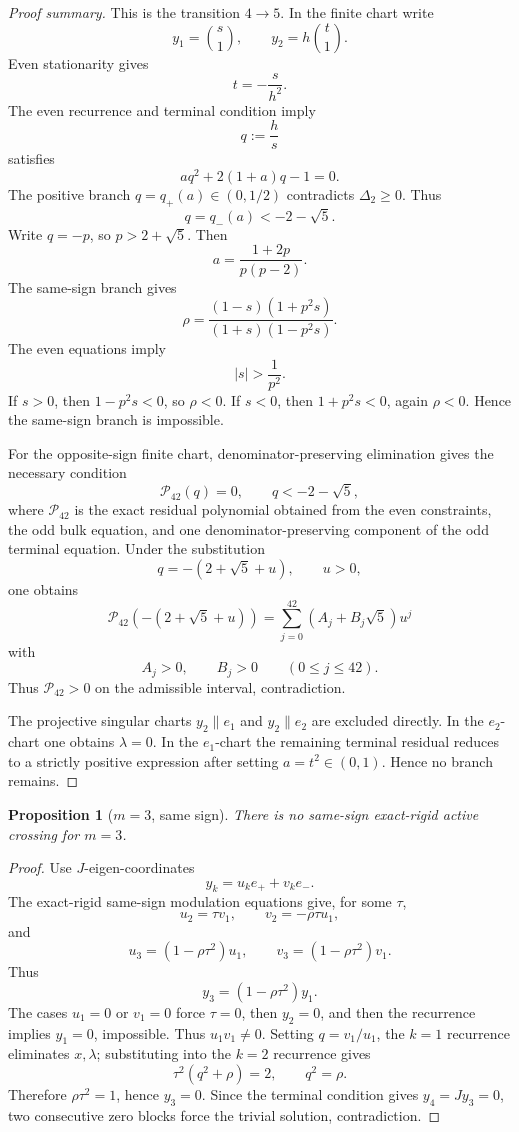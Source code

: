 \documentclass[11pt]{article}
\numberwithin{equation}{section}
\newtheorem{proposition}[theorem]{Proposition}
\begin{document}
\begin{proof}[Proof summary]
This is the transition \(4\to5\). In the finite chart write
\[
y_1=\binom{s}{1},
\qquad
y_2=h\binom{t}{1}.
\]
Even stationarity gives
\[
t=-\frac{s}{h^2}.
\]
The even recurrence and terminal condition imply
\[
q:=\frac hs
\]
satisfies
\[
aq^2+2(1+a)q-1=0.
\]
The positive branch \(q=q_+(a)\in(0,1/2)\) contradicts \(\Delta_2\ge0\). Thus
\[
q=q_-(a)<-2-\sqrt5.
\]
Write \(q=-p\), so \(p>2+\sqrt5\). Then
\[
a=\frac{1+2p}{p(p-2)}.
\]
The same-sign branch gives
\[
\rho=
\frac{(1-s)(1+p^2s)}{(1+s)(1-p^2s)}.
\]
The even equations imply
\[
|s|>\frac1{p^2}.
\]
If \(s>0\), then \(1-p^2s<0\), so \(\rho<0\). If \(s<0\), then
\(1+p^2s<0\), again \(\rho<0\). Hence the same-sign branch is impossible.

For the opposite-sign finite chart, denominator-preserving elimination gives the
necessary condition
\[
\mathcal P_{42}(q)=0,
\qquad q<-2-\sqrt5,
\]
where \(\mathcal P_{42}\) is the exact residual polynomial obtained from the even
constraints, the odd bulk equation, and one denominator-preserving component of
the odd terminal equation. Under the substitution
\[
q=-(2+\sqrt5+u),\qquad u>0,
\]
one obtains
\[
\mathcal P_{42}(-(2+\sqrt5+u))
=
\sum_{j=0}^{42}(A_j+B_j\sqrt5)u^j
\]
with
\[
A_j>0,\qquad B_j>0\qquad(0\le j\le42).
\]
Thus \(\mathcal P_{42}>0\) on the admissible interval, contradiction.

The projective singular charts \(y_2\parallel e_1\) and \(y_2\parallel e_2\) are excluded
directly. In the \(e_2\)-chart one obtains \(\lambda=0\). In the \(e_1\)-chart the
remaining terminal residual reduces to a strictly positive expression after setting
\(a=t^2\in(0,1)\). Hence no branch remains.
\end{proof}

\begin{proposition}[\(m=3\), same sign]
There is no same-sign exact-rigid active crossing for \(m=3\).
\end{proposition}

\begin{proof}
Use \(J\)-eigen-coordinates
\[
y_k=u_ke_+ +v_ke_-.
\]
The exact-rigid same-sign modulation equations give, for some \(\tau\),
\[
u_2=\tau v_1,\qquad
v_2=-\rho\tau u_1,
\]
and
\[
u_3=(1-\rho\tau^2)u_1,\qquad
v_3=(1-\rho\tau^2)v_1.
\]
Thus
\[
y_3=(1-\rho\tau^2)y_1.
\]
The cases \(u_1=0\) or \(v_1=0\) force \(\tau=0\), then \(y_2=0\), and then the
recurrence implies \(y_1=0\), impossible. Thus \(u_1v_1\ne0\). Setting
\(q=v_1/u_1\), the \(k=1\) recurrence eliminates \(x,\lambda\); substituting into the
\(k=2\) recurrence gives
\[
\tau^2(q^2+\rho)=2,
\qquad
q^2=\rho.
\]
Therefore \(\rho\tau^2=1\), hence \(y_3=0\). Since the terminal condition gives
\(y_4=Jy_3=0\), two consecutive zero blocks force the trivial solution, contradiction.
\end{proof}
\end{document}
